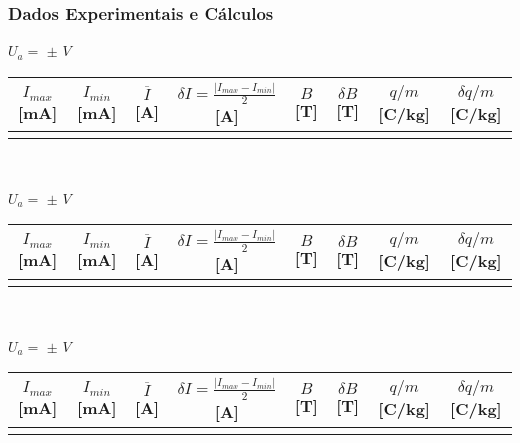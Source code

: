 \documentclass[a4paper,12pt]{article}  %
\begin{document}
\subsubsection{\sf Dados Experimentais e Cálculos}

\begin{table}[!hbp]
	\centering

	\noindent	$U_a =$ \underline{\makebox[1.5cm][r]{~}} $\pm$ \underline{\makebox[1cm][r]{~}} $V$ \\
	\begin{tabular}{|c|c|c|c|c|c|c|c|}
	\hline
	 $I_{max}$ [mA] & $I_{min}$ [mA] & $\overline{I}$ [A]	& $\delta I = \frac{| I_{max} - I_{min}|}{2}$ [A] & $B$ [T] & $\delta B$  [T] & $q/m$ [C/kg] & $\delta q/m$ [C/kg] \\
	\hline
	 &  &  & &  &  & & \\
	 \hline
 	\end{tabular}\\[10pt]
	
	\bigskip
	
	\noindent	$U_a =$ \underline{\makebox[1.5cm][r]{~}} $\pm$ \underline{\makebox[1cm][r]{~}} $V$ \\
	\begin{tabular}{|c|c|c|c|c|c|c|c|}
	\hline
	 $I_{max}$ [mA] & $I_{min}$ [mA] & $\overline{I}$ [A]	& $\delta I = \frac{| I_{max} - I_{min}|}{2}$ [A] & $B$ [T] & $\delta B$  [T] & $q/m$ [C/kg] & $\delta q/m$ [C/kg] \\
	\hline
	 &  &  & &  &  & & \\
	 \hline
 	\end{tabular}\\[10pt]

	\bigskip
	
	\noindent	$U_a =$ \underline{\makebox[1.5cm][r]{~}} $\pm$ \underline{\makebox[1cm][r]{~}} $V$ \\
	\begin{tabular}{|c|c|c|c|c|c|c|c|}
	\hline
	 $I_{max}$ [mA] & $I_{min}$ [mA] & $\overline{I}$ [A]	& $\delta I = \frac{| I_{max} - I_{min}|}{2}$ [A] & $B$ [T] & $\delta B$  [T] & $q/m$ [C/kg] & $\delta q/m$ [C/kg] \\
	\hline
	 &  &  & &  &  & & \\
	 \hline
 	\end{tabular}
	
	\label{tab:Dados2}
\end{table}
\end{document}
